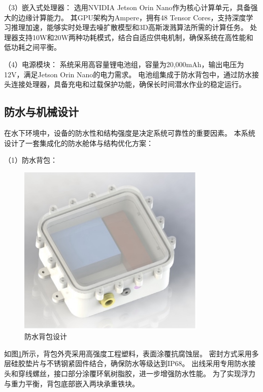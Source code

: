 （3）嵌入式处理器：
选用NVIDIA Jetson Orin Nano作为核心计算单元，具备强大的边缘计算能力。
其GPU架构为Ampere，拥有48 Tensor Cores，支持深度学习推理加速，能够实时处理去噪扩散模型和3D高斯泼溅算法所需的计算任务。
处理器支持10W和20W两种功耗模式，结合自适应供电机制，确保系统在高性能和低功耗之间平衡。

（4）电源模块：
系统采用高容量锂电池组，容量为20,000mAh，输出电压为12V，满足Jetson Orin Nano的电力需求。
电池组集成于防水背包中，通过防水接头连接处理器，具备充电和过载保护功能，确保长时间潜水作业的稳定运行。

\subsection{防水与机械设计}
在水下环境中，设备的防水性和结构强度是决定系统可靠性的重要因素。
本系统设计了一套集成化的防水舱体与结构优化方案：

（1）防水背包：
\begin{figure}
    \centering
    \includegraphics[width=0.8\textwidth]{figures/ch5/bag.jpg}
    \caption{防水背包设计}
    \label{img:bag}
\end{figure}

如图\ref{img:bag}所示，背包外壳采用高强度工程塑料，表面涂覆抗腐蚀层。
密封方式采用多层硅胶垫片与不锈钢紧固件结合，确保防水等级达到IP68。
出线采用专用防水接头和穿线螺丝，接口部分涂覆环氧树脂胶，进一步增强防水性能。
为了实现浮力与重力平衡，背包底部嵌入两块承重铁块。

